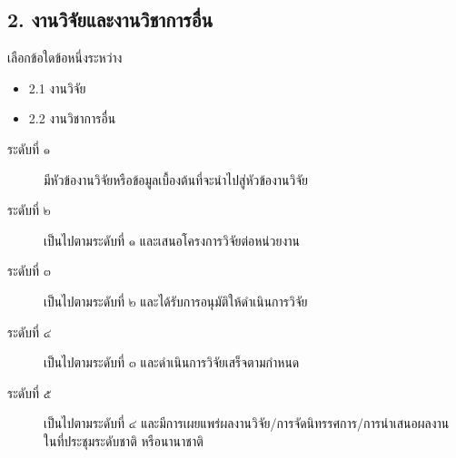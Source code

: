 \documentclass[a4paper,12pt,english]{sphinxmanual}
\begin{document}
\subsection{2. งานวิจัยและงานวิชาการอื่น}
\label{\detokenize{submission_part1:id14}}
เลือกข้อใดข้อหนึ่งระหว่าง
\begin{itemize}
\item {} 
2.1 งานวิจัย

\item {} 
2.2 งานวิชาการอื่น

\end{itemize}
\begin{description}
\item[{ระดับที่ ๑}] \leavevmode
มีหัวข้องานวิจัยหรือข้อมูลเบื้องต้นที่จะนำไปสู่หัวข้องานวิจัย

\item[{ระดับที่ ๒}] \leavevmode
เป็นไปตามระดับที่ ๑ และเสนอโครงการวิจัยต่อหน่วยงาน

\item[{ระดับที่ ๓}] \leavevmode
เป็นไปตามระดับที่ ๒ และได้รับการอนุมัติให้ดำเนินการวิจัย

\item[{ระดับที่ ๔}] \leavevmode
เป็นไปตามระดับที่ ๓ และดำเนินการวิจัยเสร็จตามกำหนด

\item[{ระดับที่ ๕}] \leavevmode
เป็นไปตามระดับที่ ๔ และมีการเผยแพร่ผลงานวิจัย/การจัดนิทรรศการ/การนำเสนอผลงาน ในที่ประชุมระดับชาติ หรือนานาชาติ

\end{description}
\end{document}
